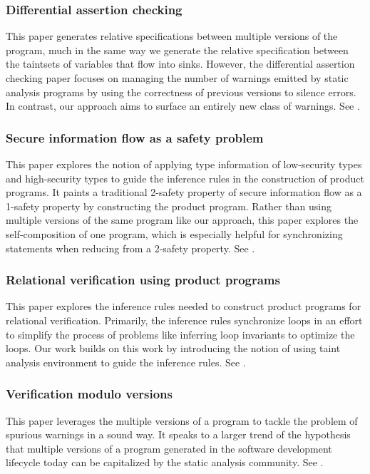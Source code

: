 \documentclass[letterpaper,twocolumn,10pt]{article}
\begin{document}
\subsubsection{Differential assertion checking}

This paper generates relative specifications between multiple versions of the program, much in the same way we generate the relative specification between the taintsets of variables that flow into sinks. However, the differential assertion checking paper focuses on managing the number of warnings emitted by static analysis programs by using the correctness of previous versions to silence errors. In contrast, our approach aims to surface an entirely new class of warnings. See \cite{lahiri2013differential}.

\subsubsection{Secure information flow as a safety problem}
This paper explores the notion of applying type information of low-security types and high-security types to guide the inference rules in the construction of product programs. It paints a traditional 2-safety property of secure information flow as a 1-safety property by constructing the product program. Rather than using multiple versions of the same program like our approach, this paper explores the self-composition of one program, which is especially helpful for synchronizing statements when reducing from a 2-safety property. See  \cite{terauchi2005secure}.

\subsubsection{Relational verification using product programs}

This paper explores the inference rules needed to construct product programs for relational verification. Primarily, the inference rules synchronize loops in an effort to simplify the process of problems like inferring loop invariants to optimize the loops. Our work builds on this work by introducing the notion of using taint analysis environment to guide the inference rules. See \cite{barthe2011relational}.

\subsubsection{Verification modulo versions}

This paper leverages the multiple versions of a program to tackle the problem of spurious warnings in a sound way. It speaks to a larger trend of the hypothesis that multiple versions of a program generated in the software development lifecycle today can be capitalized by the static analysis community. See \cite{logozzo2014verification}.
\end{document}
